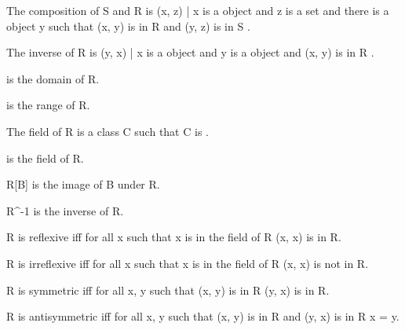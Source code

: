 \documentclass{article}
\begin{document}
\begin{forthel}
    \begin{definition} 
      The composition of S and R is { (x, z) | x is a object and z is a set and there is a object y such that (x, y) is in R and (y, z) is in S }.
    \end{definition}

    \begin{definition} 
      The inverse of R is { (y, x) | x is a object and y is a object and (x, y) is in R }.
    \end{definition}

    \begin{definition} 
       is the domain of R.
    \end{definition}

    \begin{definition} 
       is the range of R.
    \end{definition}

    \begin{definition}
      The field of R is a class C such that C is .
    \end{definition}

    \begin{definition} 
       is the field of R.
    \end{definition}

    \begin{definition} 
      R[B] is the image of B under R.
    \end{definition}

    \begin{definition} 
      R^{-1} is the inverse of R.
    \end{definition}

    \begin{definition}
      R is reflexive iff for all x such that x is in the field of R (x, x) is in R.
    \end{definition}

    \begin{definition}
      R is irreflexive iff for all x such that x is in the field of R (x, x) is not in R.
    \end{definition}

    \begin{definition}
      R is symmetric iff for all x, y such that (x, y) is in R (y, x) is in R.
    \end{definition}

    \begin{definition}
      R is antisymmetric iff for all x, y such that (x, y) is in R and (y, x) is in R x = y.
    \end{definition}


\end{forthel}
\end{document}
